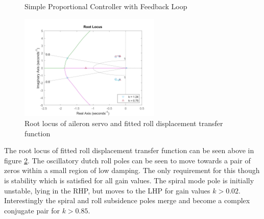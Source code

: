 \documentclass{article}
\begin{document}
\begin{figure}[H]
    \begin{center}
    \end{center}
    \caption{Simple Proportional Controller with Feedback Loop}
    \label{fig:roll_autopilot_diagram}
\end{figure}

\begin{figure}[H]
    \centering
    \includegraphics[width=0.6\textwidth]{figures/roll_autopilot_locus_uncompensated.png}
    \caption{Root locus of aileron servo and fitted roll displacement transfer function}
    \label{fig:roll_autopilot_uncompensated_locus}
\end{figure}

The root locus of fitted roll displacement transfer function can be seen above in figure \ref{fig:roll_autopilot_uncompensated_locus}.
The oscillatory dutch roll poles can be seen to move towards a pair of zeros within a small region of low damping.
The only requirement for this though is stability which is satisfied for all gain values.
The spiral mode pole is initially unstable, lying in the RHP, but moves to the LHP for gain values $k > 0.02$.
Interestingly the spiral and roll subsidence poles merge and become a complex conjugate pair for $k > 0.85$.
\end{document}
